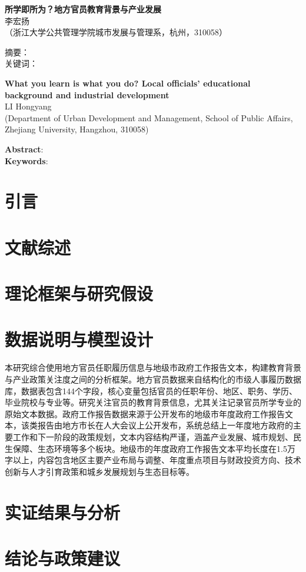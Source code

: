 \documentclass[a4paper,11pt, fontset=fandol]{ctexart}
\newcommand*{\TNR}{\CJKfamily{TNR}}
\newcommand{\sanhao}{\fontsize{15.75pt}{\baselineskip}\selectfont}
\newcommand{\sihao}{\fontsize{14pt}{\baselineskip}\selectfont}
\newcommand{\wuhao}{\fontsize{10.5pt}{\baselineskip}\selectfont}
\begin{document}
\begin{center}
\textbf{\sanhao 所学即所为？地方官员教育背景与产业发展} \\
\kaishu \wuhao 李宏扬 \\
\songti （浙江大学公共管理学院城市发展与管理系，杭州，310058）\\
\end{center}
\heiti \noindent 摘要： \songti \\
\heiti \noindent 关键词：\songti 


\begin{center}
\textbf{\TNR\sihao What you learn is what you do? Local officials' educational background and industrial development} \\
\wuhao LI Hongyang \\
(Department of Urban Development and Management, School of Public Affairs, Zhejiang University, Hangzhou, 310058) 
\end{center}
\noindent \textbf{Abstract}: \\
\noindent \textbf{Keywords}: 

\newpage
\tableofcontents
\newpage
\songti

\section{引言}

\section{文献综述}

\section{理论框架与研究假设}

\section{数据说明与模型设计}
本研究综合使用地方官员任职履历信息与地级市政府工作报告文本，构建教育背景与产业政策关注度之间的分析框架。地方官员数据来自结构化的市级人事履历数据库，数据表包含144个字段，核心变量包括官员的任职年份、地区、职务、学历、毕业院校与专业等。研究关注官员的教育背景信息，尤其关注记录官员所学专业的原始文本数据。政府工作报告数据来源于公开发布的地级市年度政府工作报告文本，该类报告由地方市长在人大会议上公开发布，系统总结上一年度地方政府的主要工作和下一阶段的政策规划，文本内容结构严谨，涵盖产业发展、城市规划、民生保障、生态环境等多个板块。地级市的年度政府工作报告文本平均长度在1.5万字以上，内容包含地区主要产业布局与调整、年度重点项目与财政投资方向、技术创新与人才引育政策和城乡发展规划与生态目标等。

\section{实证结果与分析}

\section{结论与政策建议}
\end{document}
